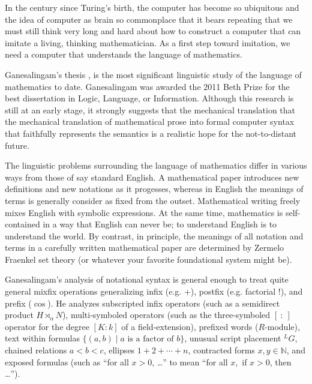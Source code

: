 \documentclass{llncs}
\newcommand{\ring}[1]{\mathbb{#1}}
\begin{document}
In the century since Turing's birth, the computer has become so
ubiquitous and the idea of computer as brain so commonplace that it
bears repeating that we must still think very long and hard about how
to construct a computer that can imitate a living, thinking
mathematician.  As a first step toward imitation, we need a computer
that understands the language of mathematics.


\bigskip

Ganesalingam's thesis \cite{Gan09}, \cite{Gan10} is the most
significant linguistic study of the language of mathematics to date.
Ganesalingam was awarded the 2011 Beth Prize for the best dissertation
in Logic, Language, or Information.  Although this research is still
at an early stage, it strongly suggests that the mechanical
translation that the mechanical translation of mathematical prose into
formal computer syntax that faithfully represents the semantics is a
realistic hope for the not-to-distant future.



The linguistic problems surrounding the language of mathematics differ
in various ways  from those of say standard English.  A
mathematical paper introduces new definitions and new notations as it
progesses, whereas in English the meanings of terms is generally
consider as fixed from the outset.  Mathematical writing freely mixes
English with symbolic expressions.  At the same time, mathematics is
self-contained in a way that English can never be; to understand
English is to understand the world.  By contrast, in principle, the
meanings of all notation and terms in a carefully written mathematical
paper are determined by Zermelo Fraenkel set theory (or whatever your
favorite foundational system might be).

Ganesalingam's analysis of notational syntax is general enough to treat quite
general mixfix operations generalizing 
infix (e.g. +), postfix (e.g. factorial !), and prefix ($\cos$).  
He analyzes subscripted infix
operators (such as a semidirect product $H\rtimes_\alpha N$),
multi-symboled operators (such as the three-symboled $[~:~]$ operator
for the degree $[K:k]$ of a field-extension), prefixed words
($R$-module), text within formulas $\{(a,b) \mid a \text{~is a factor
  of~} b\}$, unusual script placement ${}^LG$, chained relations
$a<b<c$, ellipses $1+2+\cdots+n$, contracted forms $x,y\in\ring{N}$,
and exposed formulas (such as ``for all $x>0$, \dots'' to mean ``for
all $x$,~if $x>0$, then \dots'').
\end{document}
